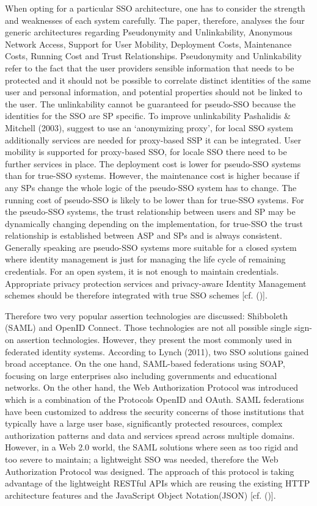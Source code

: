{{		When opting for a particular SSO architecture, one has to consider the strength and weaknesses of each system carefully. The paper, therefore, analyses the four generic architectures regarding Pseudonymity and Unlinkability, Anonymous Network Access, Support for User Mobility, Deployment Costs, Maintenance Costs, Running Cost and Trust Relationships. Pseudonymity and Unlinkability refer to the fact that the user providers sensible information that needs to be protected and it should not be possible to correlate distinct identities of the same user and personal information, and potential properties should not be linked to the user. The unlinkability cannot be guaranteed for pseudo-SSO because the identities for the SSO are SP specific. To improve unlinkability   Pashalidis \& Mitchell (2003), suggest to use an ‘anonymizing proxy’, for local SSO system additionally services are needed for proxy-based SSP it can be integrated. User mobility is supported for proxy-based SSO, for locale SSO there need to be further services in place. The deployment cost is lower for pseudo-SSO systems than for true-SSO systems. However, the maintenance cost is higher because if any SPs change the whole logic of the pseudo-SSO system has to change. The running cost of pseudo-SSO is likely to be lower than for true-SSO systems. For the pseudo-SSO systems, the trust relationship between users and SP may be dynamically changing depending on the implementation, for true-SSO the trust relationship is established between ASP and SPs and is always consistent. Generally speaking are pseudo-SSO systems more suitable for a closed system where identity management is just for managing the life cycle of remaining credentials. For an open system, it is not enough to maintain credentials. Appropriate privacy protection services and privacy-aware Identity Management schemes should be therefore integrated with true SSO schemes [cf. (\cite{Pashalidis:2003:10.1007/3-540-45067-X_22})]. 
			
		Therefore two very popular assertion technologies are discussed: Shibboleth (SAML) and OpenID Connect. Those technologies are not all possible single sign-on assertion technologies. However, they present the most commonly used in federated identity systems. According to Lynch (2011), two SSO solutions gained broad acceptance. On the one hand, SAML-based federations using SOAP, focusing on large enterprises also including governments and educational networks. On the other hand, the Web Authorization Protocol was introduced which is a combination of the Protocols OpenID and OAuth. SAML federations have been customized to address the security concerns of those institutions that typically have a large user base, significantly protected resources, complex authorization patterns and data and services spread across multiple domains. However, in a Web 2.0 world, the SAML solutions where seen as too rigid and too severe to maintain; a lightweight SSO was needed, therefore the Web Authorization Protocol was designed. The approach of this protocol is taking advantage of the lightweight RESTful APIs which are reusing the existing HTTP architecture features and the JavaScript Object Notation(JSON) [cf. (\cite{Lynch:2017:IIG})].
			
}}
